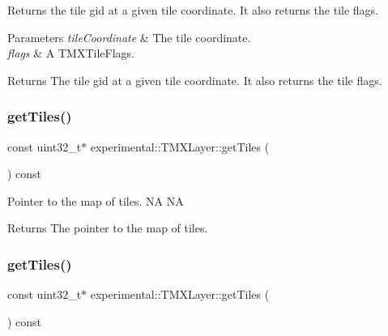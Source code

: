 Returns the tile gid at a given tile coordinate. It also returns the tile flags.


\begin{DoxyParams}{Parameters}
{\em tile\+Coordinate} & The tile coordinate. \\
\hline
{\em flags} & A T\+M\+X\+Tile\+Flags. \\
\hline
\end{DoxyParams}
\begin{DoxyReturn}{Returns}
The tile gid at a given tile coordinate. It also returns the tile flags. 
\end{DoxyReturn}
\mbox{\label{classexperimental_1_1TMXLayer_aff7874cd19e0e387117b0f5c101c62f4}} 
\subsubsection{\texorpdfstring{get\+Tiles()}{getTiles()}\hspace{0.1cm}{\footnotesize\ttfamily [1/2]}}
{\footnotesize\ttfamily const uint32\+\_\+t$\ast$ experimental\+::\+T\+M\+X\+Layer\+::get\+Tiles (\begin{DoxyParamCaption}{ }\end{DoxyParamCaption}) const\hspace{0.3cm}{\ttfamily [inline]}}

Pointer to the map of tiles.  NA  NA \begin{DoxyReturn}{Returns}
The pointer to the map of tiles. 
\end{DoxyReturn}
\mbox{\label{classexperimental_1_1TMXLayer_aff7874cd19e0e387117b0f5c101c62f4}} 
\subsubsection{\texorpdfstring{get\+Tiles()}{getTiles()}\hspace{0.1cm}{\footnotesize\ttfamily [2/2]}}
{\footnotesize\ttfamily const uint32\+\_\+t$\ast$ experimental\+::\+T\+M\+X\+Layer\+::get\+Tiles (\begin{DoxyParamCaption}{ }\end{DoxyParamCaption}) const\hspace{0.3cm}{\ttfamily [inline]}}

